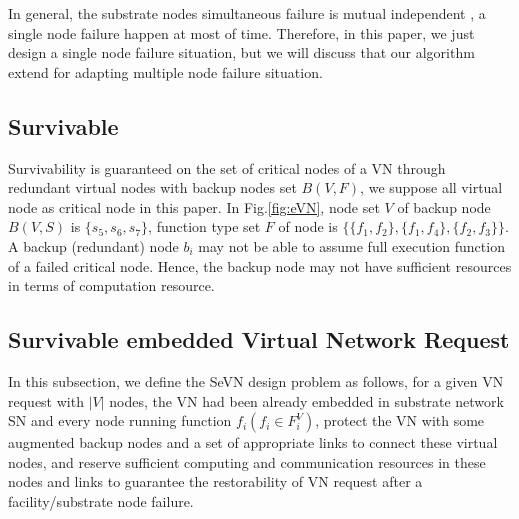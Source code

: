 In general, the substrate nodes simultaneous failure is mutual independent , a single node failure happen at most of time\cite{yeow2011designing}. Therefore, in this paper, we just design a single node failure situation, but we will discuss that our algorithm extend for adapting multiple node failure situation.


\subsection{Survivable}

Survivability is guaranteed on the set of critical nodes of a VN through redundant virtual nodes with backup nodes set $B(V,F)$, we suppose all virtual node as critical node in this paper. In Fig.\ref{fig:eVN}, node set $V$ of backup node $B(V,S)$ is $\{s_5,s_6,s_7\}$, function type set $F$ of node is $\{\{f_1,f_2\},\{f_1,f_4\},\{f_2,f_3\}\}$. A backup (redundant) node $b_i$ may not be able to assume full execution function of a failed critical node. Hence, the backup node may not have sufficient resources in terms of computation resource.





\subsection{Survivable embedded Virtual Network Request}

In this subsection, we define the SeVN design problem as follows, for a given VN request with $|V|$ nodes, the VN had been already embedded in substrate network SN and every node running function $f_i(f_i\in F^V_i)$, protect the VN with some augmented backup nodes and a set of appropriate links to connect these virtual nodes, and reserve sufficient computing and communication resources in these nodes and links to guarantee the restorability of VN request after a facility/substrate node failure.

